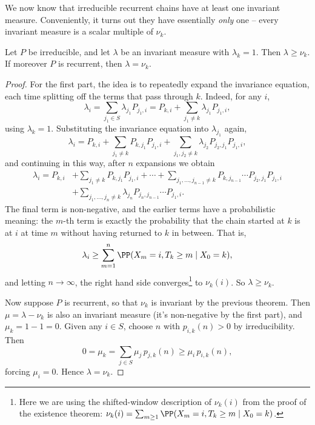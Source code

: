 \documentclass[a4paper]{scrartcl}
\begin{document}
We now know that irreducible recurrent chains have at least one invariant measure. Conveniently, it turns out they have essentially \emph{only} one -- every invariant measure is a scalar multiple of $\nu_k$.

\begin{theorem}
	Let $P$ be irreducible, and let $\lambda$ be an invariant measure with $\lambda_k = 1$. Then $\lambda \geq \nu_k$. If moreover $P$ is recurrent, then $\lambda = \nu_k$.
\end{theorem}
\begin{proof}
	For the first part, the idea is to repeatedly expand the invariance equation, each time splitting off the terms that pass through $k$. Indeed, for any $i$,
	$$
	\lambda_i = \sum_{j_1 \in S} \lambda_{j_1} P_{j_1, i} = P_{k, i} + \sum_{j_1 \neq k} \lambda_{j_1}P_{j_1, i},
	$$
	using $\lambda_k = 1$. Substituting the invariance equation into $\lambda_{j_1}$ again,
	$$
	\lambda_i = P_{k, i} + \sum_{j_1 \neq k} P_{k, j_1}P_{j_1, i} + \sum_{j_1, j_2 \neq k} \lambda_{j_2} P_{j_2, j_1}P_{j_1, i},
	$$
	and continuing in this way, after $n$ expansions we obtain
	\begin{align*}
	\lambda_i = P_{k, i} &+ \sum_{j_1 \neq k} P_{k, j_1}P_{j_1, i} + \cdots + \sum_{j_1, \dots, j_{n - 1} \neq k} P_{k, j_{n -1}} \cdots P_{j_2, j_1} P_{j_1, i} \\
	&+ \sum_{j_1, \dots, j_n \neq k} \lambda_{j_n} P_{j_n, j_{n - 1}} \cdots P_{j_1, i}.
	\end{align*}
	The final term is non-negative, and the earlier terms have a probabilistic meaning: the $m$-th term is exactly the probability that the chain started at $k$ is at $i$ at time $m$ without having returned to $k$ in between. That is,
	$$
	\lambda_i \geq \sum_{m = 1}^{n} \PP(X_m = i, T_k \geq m \mid X_0 = k),
	$$
	and letting $n \rightarrow \infty$, the right hand side converges\footnote{Here we are using the shifted-window description of $\nu_k(i)$ from the proof of the existence theorem: $\nu_k(i) = \sum_{m \geq 1} \PP(X_m = i, T_k \geq m \mid X_0 = k)$.} to $\nu_k(i)$. So $\lambda \geq \nu_k$.

	Now suppose $P$ is recurrent, so that $\nu_k$ is invariant by the previous theorem. Then $\mu = \lambda - \nu_k$ is also an invariant measure (it's non-negative by the first part), and $\mu_k = 1 - 1 = 0$. Given any $i \in S$, choose $n$ with $p_{i, k}(n) > 0$ by irreducibility. Then
	$$
	0 = \mu_k = \sum_{j \in S} \mu_j\, p_{j, k}(n) \geq \mu_i \, p_{i, k}(n),
	$$
	forcing $\mu_i = 0$. Hence $\lambda = \nu_k$.
\end{proof}
\end{document}
